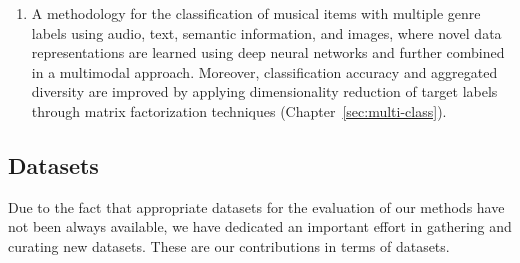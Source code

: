 \begin{enumerate}

\item 
A methodology for the classification of musical items with multiple genre labels using audio, text, semantic information, and images, where novel data representations are learned using deep neural networks and further combined in a multimodal approach. Moreover, classification accuracy and aggregated diversity are improved by applying dimensionality reduction of target labels through matrix factorization techniques (Chapter~\ref{sec:multi-class}). %

\end{enumerate}

\subsection{Datasets}

Due to the fact that appropriate datasets for the evaluation of our methods have not been always available, we have dedicated an important effort in gathering and curating new datasets. These are our contributions in terms of datasets.

